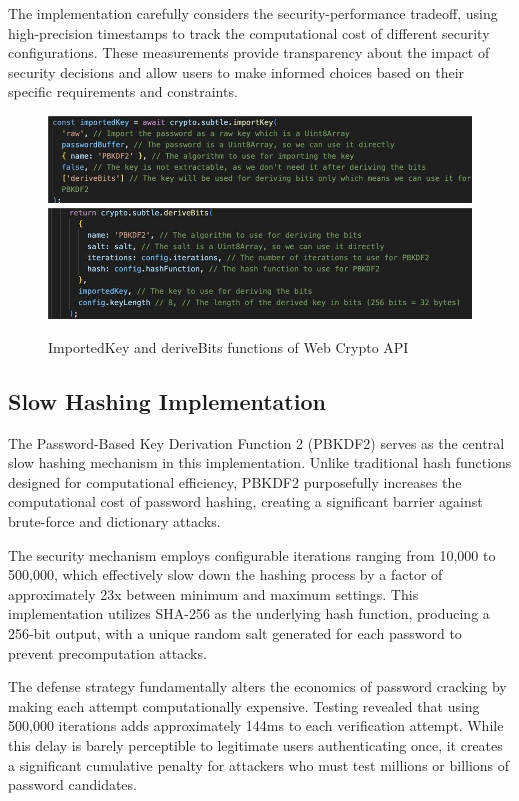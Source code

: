 \documentclass[11pt,a4paper]{article}
\begin{document}
The implementation carefully considers the security-performance tradeoff, using high-precision timestamps to track the computational cost of different security configurations. These measurements provide transparency about the impact of security decisions and allow users to make informed choices based on their specific requirements and constraints.
\begin{figure}[!h]
  \centering
  \includegraphics[width=1\linewidth]{images/Algo1.jpg}
  \includegraphics[width= 1\linewidth]{images/Algo2.jpg}
  \caption{ImportedKey and deriveBits functions of Web Crypto API}
  \label{Algorithms}
\end{figure}

\subsection{Slow Hashing Implementation}
The Password-Based Key Derivation Function 2 (PBKDF2) serves as the central slow hashing mechanism in this implementation. Unlike traditional hash functions designed for computational efficiency, PBKDF2 purposefully increases the computational cost of password hashing, creating a significant barrier against brute-force and dictionary attacks.

The security mechanism employs configurable iterations ranging from 10,000 to 500,000, which effectively slow down the hashing process by a factor of approximately 23x between minimum and maximum settings. This implementation utilizes SHA-256 as the underlying hash function, producing a 256-bit output, with a unique random salt generated for each password to prevent precomputation attacks.

The defense strategy fundamentally alters the economics of password cracking by making each attempt computationally expensive. Testing revealed that using 500,000 iterations adds approximately 144ms to each verification attempt. While this delay is barely perceptible to legitimate users authenticating once, it creates a significant cumulative penalty for attackers who must test millions or billions of password candidates.
\end{document}
